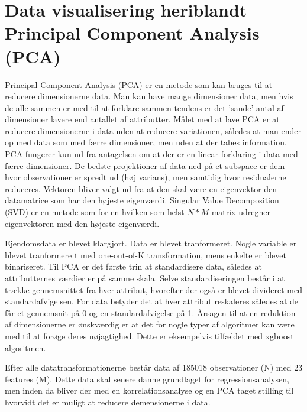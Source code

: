 \documentclass{report}
\begin{document}
\section{Data visualisering heriblandt Principal Component Analysis (PCA)}

Principal Component Analysis (PCA) er en metode som kan bruges til at reducere dimensionerne data.
Man kan have mange dimensioner data, men hvis de alle sammen er med til at forklare sammen tendens
er det 'sande' antal af dimensioner lavere end antallet af attributter. Målet med at lave PCA er at
reducere dimensionerne i data uden at reducere variationen, således at man ender op med data som
med færre dimensioner, men uden at der tabes information. PCA fungerer kun ud fra antagelsen om at
der er en linear forklaring i data med færre dimensioner. De bedste projektioner af data ned på et
subspace er dem hvor observationer er spredt ud (høj varians), men samtidig hvor residualerne
reduceres. 
Vektoren bliver valgt ud fra at den skal være en eigenvektor den datamatrice som har den højeste
eigenværdi. Singular Value Decomposition (SVD) er en metode som for en hvilken som helst $N*M$
matrix udregner eigenvektoren med den højeste eigenværdi.  

Ejendomsdata er blevet klargjort. Data er blevet tranformeret. Nogle variable er blevet tranformere
t med one-out-of-K transformation, mens enkelte er blevet binariseret. 
Til PCA er det første trin at standardisere data, således at attributternes værdier er på samme
skala. Selve standardiseringen består i at trække gennemsnittet fra hver attribut, hvorefter der
også er blevet divideret med standardafvigelsen. For data betyder det at hver attribut reskaleres
således at de får et gennemsnit på 0 og en standardafvigelse på 1. 
Årsagen til at en reduktion af dimensionerne er ønskværdig er at det for nogle typer af algoritmer
kan være med til at forøge deres nøjagtighed. Dette er eksempelvis tilfældet med xgboost
algoritmen. 

Efter alle datatransformationerne består data af 185018 observationer (N) med 23 features (M).
Dette data skal senere danne grundlaget for regressionsanalysen, men inden da bliver der med en
korrelationsanalyse og en PCA taget stilling til hvorvidt det er muligt at reducere demensionerne i
data. 
\end{document}
